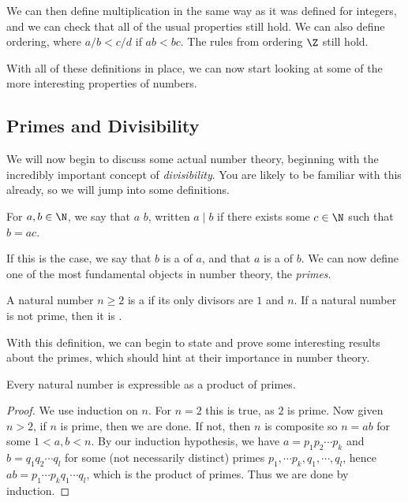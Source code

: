We can then define multiplication in the same way as it was defined for integers, and we can check that all of the usual properties still hold. We can also define ordering, where $a/b < c/d$ if $ab < bc$. The rules from ordering $\Z$ still hold.

With all of these definitions in place, we can now start looking at some of the more interesting properties of numbers.

\subsection{Primes and Divisibility}

We will now begin to discuss some actual number theory, beginning with the incredibly important concept of \emph{divisibility}. You are likely to be familiar with this already, so we will jump into some definitions.

\begin{definition}[Divisibility]
	For $a, b \in \N$, we say that $a$  $b$, written $a \mid b$ if there exists some $c \in \N$ such that $b = ac$.
\end{definition}

If this is the case, we say that $b$ is a  of $a$, and that $a$ is a  of $b$. We can now define one of the most fundamental objects in number theory, the \emph{primes}.

\begin{definition}[Primes]
	A natural number $n \geq 2$ is a  if its only divisors are $1$ and $n$. If a natural number is not prime, then it is .
\end{definition}

With this definition, we can begin to state and prove some interesting results about the primes, which should hint at their importance in number theory.

\begin{theorem}\label{thm:product-primes}
	Every natural number is expressible as a product of primes.
\end{theorem}
\begin{proof}
	We use induction on $n$. For $n = 2$ this is true, as $2$ is prime. Now given $n > 2$, if $n$ is prime, then we are done. If not, then $n$ is composite so $n = ab$ for some $1 < a, b < n$. By our induction hypothesis, we have $a = p_1 p_2 \cdots p_k$ and $b = q_1 q_2 \cdots q_l$ for some (not necessarily distinct) primes $p_1, \cdots p_k, q_1, \cdots, q_l$, hence $ab = p_1 \cdots p_k q_1 \cdots q_l$, which is the product of primes. Thus we are done by induction.
\end{proof}

